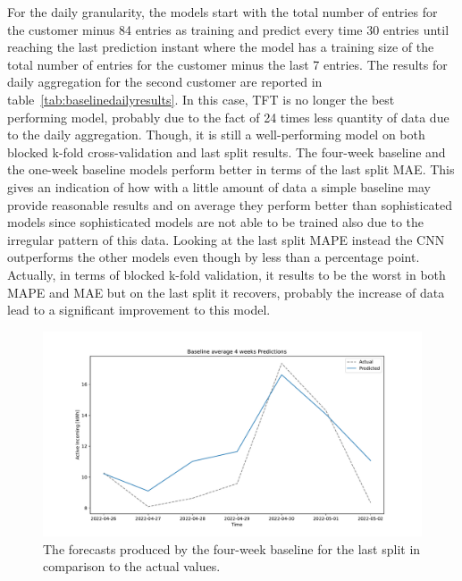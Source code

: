 For the daily granularity, the models start with the total number of entries for the customer minus 84 entries as training and predict every time 30 entries until reaching the last prediction instant where the model has a training size of the total number of entries for the customer minus the last 7 entries.
The results for daily aggregation for the second customer are reported in table~\ref{tab:baselinedailyresults}.
In this case, TFT is no longer the best performing model, probably due to the fact of 24 times less quantity of data due to the daily aggregation.
Though, it is still a well-performing model on both blocked k-fold cross-validation and last split results.
The four-week baseline and the one-week baseline models perform better in terms of the last split MAE.
This gives an indication of how with a little amount of data a simple baseline may provide reasonable results and on average they perform better than sophisticated models since sophisticated models are not able to be trained also due to the irregular pattern of this data.
Looking at the last split MAPE instead the CNN outperforms the other models even though by less than a percentage point.
Actually, in terms of blocked k-fold validation, it results to be the worst in both MAPE and MAE but on the last split it recovers, probably the increase of data lead to a significant improvement to this model.

\begin{figure}[H]
\centering
\includegraphics[width=1\textwidth]{images/baseline/baseline_average_4_weeks_daily_aggregated}
\caption{The forecasts produced by the four-week baseline for the last split in comparison to the actual values.}
\label{fig:baseline4weeksdailyforecasts}
\end{figure}

